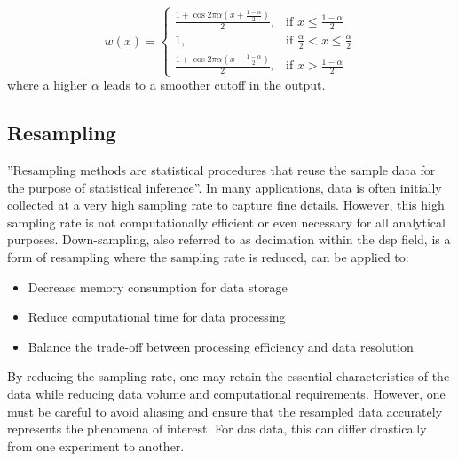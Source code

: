 \[
    w(x)= 
\begin{cases}
    \frac{1 + \cos{2 \pi \alpha (x + \frac{1-\alpha}{2})}}{2}, & \text{if } x \leq \frac{1-\alpha}{2}\\
    1,              & \text{if } \frac{\alpha}{2} < x \leq \frac{\alpha}{2}\\
    \frac{1 + \cos{2 \pi \alpha (x - \frac{1-\alpha}{2})}}{2}, & \text{if } x > \frac{1-\alpha}{2}
\end{cases}
\]
where a higher $\alpha$ leads to a smoother cutoff in the output.
\subsection{Resampling}
%
''Resampling methods are statistical procedures that reuse the sample data for the purpose of statistical inference''\cite{https://doi.org/10.1002/widm.1054}. In many applications, data is often initially collected at a very high sampling rate to capture fine details. However, this high sampling rate is not computationally efficient or even necessary for all analytical purposes. Down-sampling, also referred to as decimation within the \acrshort{dsp} field, is a form of resampling where the sampling rate is reduced, can be applied to:
%
\begin{itemize}
    \item Decrease memory consumption for data storage
    \item Reduce computational time for data processing
    \item Balance the trade-off between processing efficiency and data resolution
\end{itemize}
%
By reducing the sampling rate, one may retain the essential characteristics of the data while reducing data volume and computational requirements. However, one must be careful to avoid aliasing and ensure that the resampled data accurately represents the phenomena of interest. For \acrshort{das} data, this can differ drastically from one experiment to another. 
